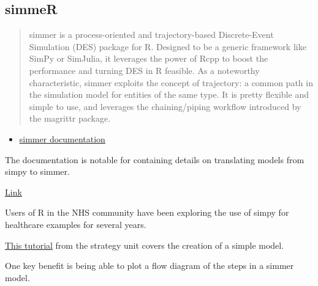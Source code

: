 \documentclass[
  letterpaper,
  DIV=11,
  numbers=noendperiod]{scrreprt}
\providecommand{\tightlist}{%
  \setlength{\itemsep}{0pt}\setlength{\parskip}{0pt}}\usepackage{longtable,booktabs,array}
\begin{document}
\subsection{simmeR}\label{simmer}

\begin{quote}
simmer is a process-oriented and trajectory-based Discrete-Event
Simulation (DES) package for R. Designed to be a generic framework like
SimPy or SimJulia, it leverages the power of Rcpp to boost the
performance and turning DES in R feasible. As a noteworthy
characteristic, simmer exploits the concept of trajectory: a common path
in the simulation model for entities of the same type. It is pretty
flexible and simple to use, and leverages the chaining/piping workflow
introduced by the magrittr package.
\end{quote}

\begin{itemize}
\tightlist
\item
  \href{https://r-simmer.org/}{simmer documentation}
\end{itemize}

The documentation is notable for containing details on translating
models from simpy to simmer.

\href{https://r-simmer.org/articles/simmer-05-simpy}{Link}

Users of R in the NHS community have been exploring the use of simpy for
healthcare examples for several years.

\href{https://the-strategy-unit.github.io/des_simmer_workshop/}{This
tutorial} from the strategy unit covers the creation of a simple model.

One key benefit is being able to plot a flow diagram of the steps in a
simmer model.
\end{document}
